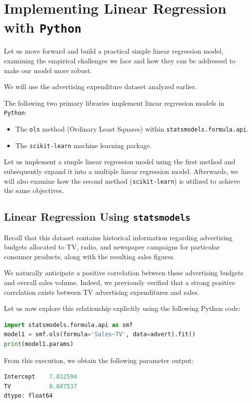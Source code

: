 \section{Implementing Linear Regression with \texttt{Python}}

Let us move forward and build a practical simple linear regression model, examining the empirical challenges we face and how they can be addressed to make our model more robust.

We will use the advertising expenditure dataset analyzed earlier.

The following two primary libraries implement linear regression models in \texttt{Python}:
\begin{itemize}
	\item The \texttt{ols} method (Ordinary Least Squares) within \texttt{statsmodels.formula.api}.
	\item The \texttt{scikit-learn} machine learning package.
\end{itemize}

Let us implement a simple linear regression model using the first method and subsequently expand it into a multiple linear regression model. Afterwards, we will also examine how the second method (\texttt{scikit-learn}) is utilized to achieve the same objectives.

\subsection{Linear Regression Using \texttt{statsmodels}}


Recall that this dataset contains historical information regarding advertising budgets allocated to TV, radio, and newspaper campaigns for particular consumer products, along with the resulting sales figures.

We naturally anticipate a positive correlation between these advertising budgets and overall sales volume. Indeed, we previously verified that a strong positive correlation exists between TV advertising expenditures and sales.

Let us now explore this relationship explicitly using the following Python code:
\begin{lstlisting}[language=Python]
import statsmodels.formula.api as smf
model1 = smf.ols(formula='Sales~TV', data=advert).fit()
print(model1.params)
\end{lstlisting}

From this execution, we obtain the following parameter output:
\begin{lstlisting}[language=Python]
Intercept    7.032594
TV           0.047537
dtype: float64
\end{lstlisting}

